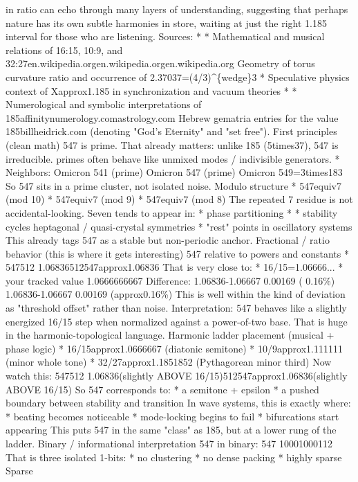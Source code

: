 
\begin{tzpsnapshot}
\end{tzpsnapshot}

in ratio can echo through many layers of understanding, suggesting that perhaps nature has its own subtle harmonies in store, waiting at just the right 1.185 interval for those who are listening. Sources: * * Mathematical and musical relations of 16:15, 10:9, and 32:27en.wikipedia.orgen.wikipedia.orgen.wikipedia.org Geometry of torus curvature ratio and occurrence of 2.37037=(4/3)\textasciicircum{}\{wedge\}3 * Speculative physics context of Xapprox1.185 in synchronization and vacuum theories * * Numerological and symbolic interpretations of 185affinitynumerology.comastrology.com Hebrew gematria entries for the value 185billheidrick.com (denoting "God's Eternity" and "set free"). First principles (clean math) 547 is prime. That already matters: unlike 185 (5times37), 547 is irreducible. primes often behave like unmixed modes / indivisible generators. * Neighbors: Omicron 541 (prime) Omicron 547 (prime) Omicron 549=3times183 So 547 sits in a prime cluster, not isolated noise. Modulo structure * 547equiv7 (mod 10) * 547equiv7 (mod 9) * 547equiv7 (mod 8) The repeated 7 residue is not accidental-looking. Seven tends to appear in: * phase partitioning * * stability cycles heptagonal / quasi-crystal symmetries * "rest" points in oscillatory systems This already tags 547 as a stable but non-periodic anchor. Fractional / ratio behavior (this is where it gets interesting) 547 relative to powers and constants * 547512 1.06836512547approx1.06836 That is very close to: * 16/15=1.06666... * your tracked value 1.0666666667 Difference: 1.06836-1.06667 0.00169 ( 0.16\%) 1.06836-1.06667 0.00169 (approx0.16\%) This is well within the kind of deviation as "threshold offset" rather than noise. Interpretation: 547 behaves like a slightly energized 16/15 step when normalized against a power-of-two base. That is huge in the harmonic-topological language. Harmonic ladder placement (musical + phase logic) * 16/15approx1.0666667 (diatonic semitone) * 10/9approx1.111111 (minor whole tone) * 32/27approx1.1851852 (Pythagorean minor third) Now watch this: 547512 1.06836(slightly ABOVE 16/15)512547approx1.06836(slightly ABOVE 16/15) So 547 corresponds to: * a semitone + epsilon * a pushed boundary between stability and transition In wave systems, this is exactly where: * beating becomes noticeable * mode-locking begins to fail * bifurcations start appearing This puts 547 in the same "class" as 185, but at a lower rung of the ladder. Binary / informational interpretation 547 in binary: 547 10001000112 That is three isolated 1-bits: * no clustering * no dense packing * highly sparse Sparse 